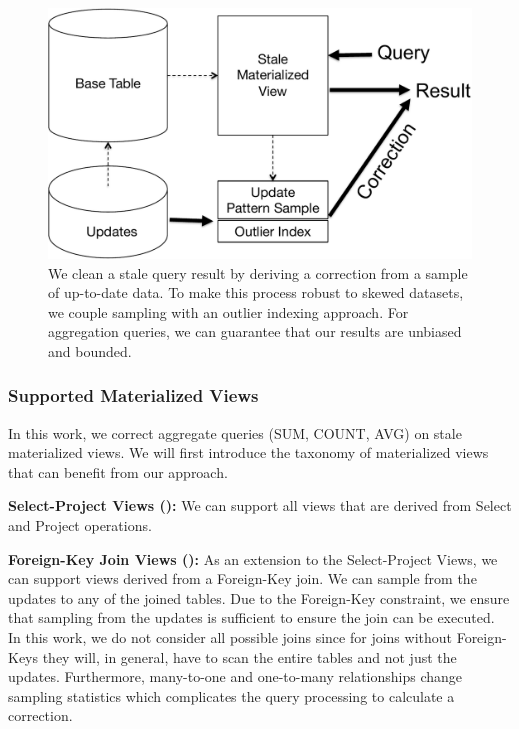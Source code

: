 \begin{figure}[h]
\label{sys-arch}
\centering
 \includegraphics[width=\columnwidth]{figs/sys-arch.pdf}
 \caption{We clean a stale query result by deriving a correction from a sample of up-to-date data. To make this process robust to skewed datasets, we couple sampling with an outlier indexing approach. For aggregation queries, we can guarantee that our results are unbiased and bounded.}
\end{figure}

\subsubsection{Supported Materialized Views}\label{subsubsec:supported-view}
In this work, we correct aggregate queries (SUM, COUNT, AVG) on stale materialized views.
We will first introduce the taxonomy of materialized views that can benefit from our approach. 
\vspace{1em}

\noindent\textbf{Select-Project Views (\spview): } We can support all views that are derived from Select and Project operations. 

\vspace{1em}

\noindent\textbf{Foreign-Key Join Views (\fjview): } As an extension to the Select-Project Views, we can support views derived from a Foreign-Key join. We can sample from the updates to any of the joined tables. Due to the Foreign-Key constraint, we ensure that sampling from the updates is sufficient to ensure the join can be executed. In this work, we do not consider all possible joins since for joins without Foreign-Keys they will, in general, have to scan the entire tables and not just the updates. Furthermore, many-to-one and one-to-many relationships change sampling statistics which complicates the query processing to calculate a correction. 


